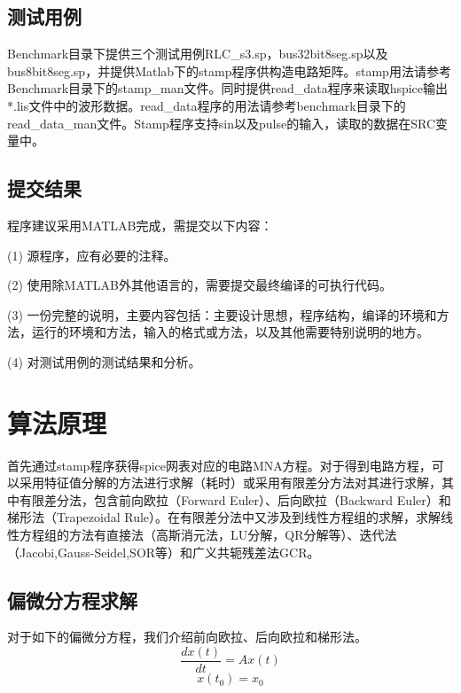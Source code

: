\documentclass[12pt]{article}
\begin{document}
\subsection{测试用例}
\qquad Benchmark目录下提供三个测试用例RLC\_s3.sp，bus32bit8seg.sp以及bus8bit8seg.sp，并提供Matlab下的stamp程序供构造电路矩阵。stamp用法请参考Benchmark目录下的stamp\_man文件。同时提供read\_data程序来读取hspice输出*.lis文件中的波形数据。read\_data程序的用法请参考benchmark目录下的read\_data\_man文件。Stamp程序支持sin以及pulse的输入，读取的数据在SRC变量中。\par

\subsection{提交结果}
\qquad 程序建议采用MATLAB完成，需提交以下内容： \par
\qquad (1) 源程序，应有必要的注释。 \par
\qquad (2) 使用除MATLAB外其他语言的，需要提交最终编译的可执行代码。 \par
\qquad (3) 一份完整的说明，主要内容包括：主要设计思想，程序结构，编译的环境和方法，运行的环境和方法，输入的格式或方法，以及其他需要特别说明的地方。 \par
\qquad (4) 对测试用例的测试结果和分析。 \par



\section{算法原理}

\qquad 首先通过stamp程序获得spice网表对应的电路MNA方程。对于得到电路方程，可以采用特征值分解的方法进行求解（耗时）或采用有限差分方法对其进行求解，其中有限差分法，包含前向欧拉（Forward Euler）、后向欧拉（Backward Euler）和梯形法（Trapezoidal Rule）。在有限差分法中又涉及到线性方程组的求解，求解线性方程组的方法有直接法（高斯消元法，LU分解，QR分解等）、迭代法（Jacobi,Gauss-Seidel,SOR等）和广义共轭残差法GCR。\par

\subsection{偏微分方程求解}
对于如下的偏微分方程，我们介绍前向欧拉、后向欧拉和梯形法。
\begin{equation}
  \frac{dx(t)}{dt}=Ax(t) 
\end{equation}
\begin{equation}
  x(t_0) = x_0
\end{equation}
\end{document}
